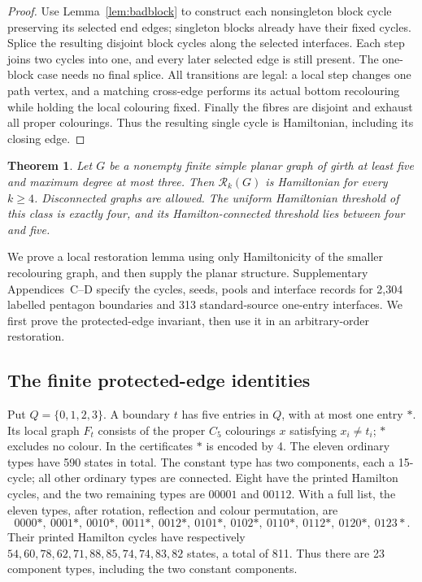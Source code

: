 \documentclass[11pt]{article}
\newtheorem{theorem}{Theorem}[section]
\theoremstyle{remark}
\newcommand{\Rk}{\mathcal R_k}
\numberwithin{equation}{section}
\numberwithin{table}{section}
\begin{document}
\begin{proof}
Use Lemma~\ref{lem:badblock} to construct each nonsingleton block
cycle preserving its selected end edges; singleton blocks already
have their fixed cycles. Splice the resulting disjoint block cycles
along the selected interfaces. Each step joins two cycles into one,
and every later selected edge is still present. The one-block case
needs no final splice. All transitions are legal: a local step changes
one path vertex, and a matching cross-edge performs its actual bottom
recolouring while holding the local colouring fixed. Finally the fibres
are disjoint and exhaust all proper colourings. Thus the resulting
single cycle is Hamiltonian, including its closing edge.
\end{proof}



\begin{theorem}\label{thm:subcubic}
Let $G$ be a nonempty finite simple planar graph of girth at least five
and maximum degree at most three. Then $\Rk(G)$ is Hamiltonian for
every $k\ge4$. Disconnected graphs are allowed. The uniform Hamiltonian threshold
of this class is exactly four, and its Hamilton-connected threshold lies
between four and five.
\end{theorem}

We prove a local restoration lemma using only Hamiltonicity of the
smaller recolouring graph, and then supply the planar structure.
Supplementary Appendices~C--D specify the cycles, seeds, pools and
interface records for 2,304 labelled pentagon boundaries and 313
standard-source one-entry interfaces. We first prove the protected-edge
invariant, then use it in an arbitrary-order restoration.

\subsection{The finite protected-edge identities}
Put $Q=\{0,1,2,3\}$. A boundary $t$ has five entries in $Q$, with at most
one entry $\ast$. Its local graph $F_t$ consists of the proper $C_5$
colourings $x$ satisfying $x_i\ne t_i$; $\ast$ excludes no colour.
In the certificates $\ast$ is encoded by 4.
The eleven ordinary types have 590 states in total.
The constant type has two components, each a 15-cycle; all other
ordinary types are connected. Eight have the printed Hamilton cycles,
and the two remaining types are $00001$ and $00112$.
With a full list, the eleven types, after rotation, reflection and
colour permutation, are
\[
0000\ast,\ 0001\ast,\ 0010\ast,\ 0011\ast,\ 0012\ast,\
0101\ast,\ 0102\ast,\ 0110\ast,\ 0112\ast,\ 0120\ast,\ 0123\ast.
\]
Their printed Hamilton cycles have respectively
$54,60,78,62,71,88,85,74,74,83,82$ states, a total of 811.
Thus there are 23 component types, including the two constant components.
\end{document}
